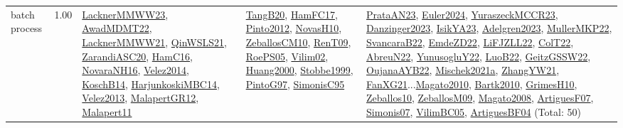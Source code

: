 {\begin{longtable}{p{3cm}r>{\raggedright\arraybackslash}p{6cm}>{\raggedright\arraybackslash}p{6cm}>{\raggedright\arraybackslash}p{8cm}}
\index{batch process}\index{Concepts!batch process}batch process &  1.00 & \hyperref[detail:LacknerMMWW23]{LacknerMMWW23}, \hyperref[detail:AwadMDMT22]{AwadMDMT22}, \hyperref[detail:LacknerMMWW21]{LacknerMMWW21}, \hyperref[detail:QinWSLS21]{QinWSLS21}, \hyperref[detail:ZarandiASC20]{ZarandiASC20}, \hyperref[detail:HamC16]{HamC16}, \hyperref[detail:NovaraNH16]{NovaraNH16}, \hyperref[detail:Velez2014]{Velez2014}, \hyperref[detail:KoschB14]{KoschB14}, \hyperref[detail:HarjunkoskiMBC14]{HarjunkoskiMBC14}, \hyperref[detail:Velez2013]{Velez2013}, \hyperref[detail:MalapertGR12]{MalapertGR12}, \hyperref[detail:Malapert11]{Malapert11} & \hyperref[detail:TangB20]{TangB20}, \hyperref[detail:HamFC17]{HamFC17}, \hyperref[detail:Pinto2012]{Pinto2012}, \hyperref[detail:NovasH10]{NovasH10}, \hyperref[detail:ZeballosCM10]{ZeballosCM10}, \hyperref[detail:RenT09]{RenT09}, \hyperref[detail:RoePS05]{RoePS05}, \hyperref[detail:Vilim02]{Vilim02}, \hyperref[detail:Huang2000]{Huang2000}, \hyperref[detail:Stobbe1999]{Stobbe1999}, \hyperref[detail:PintoG97]{PintoG97}, \hyperref[detail:SimonisC95]{SimonisC95} & \hyperref[detail:PrataAN23]{PrataAN23}, \hyperref[detail:Euler2024]{Euler2024}, \hyperref[detail:YuraszeckMCCR23]{YuraszeckMCCR23}, \hyperref[detail:Danzinger2023]{Danzinger2023}, \hyperref[detail:IsikYA23]{IsikYA23}, \hyperref[detail:Adelgren2023]{Adelgren2023}, \hyperref[detail:MullerMKP22]{MullerMKP22}, \hyperref[detail:SvancaraB22]{SvancaraB22}, \hyperref[detail:EmdeZD22]{EmdeZD22}, \hyperref[detail:LiFJZLL22]{LiFJZLL22}, \hyperref[detail:ColT22]{ColT22}, \hyperref[detail:AbreuN22]{AbreuN22}, \hyperref[detail:YunusogluY22]{YunusogluY22}, \hyperref[detail:LuoB22]{LuoB22}, \hyperref[detail:GeitzGSSW22]{GeitzGSSW22}, \hyperref[detail:OujanaAYB22]{OujanaAYB22}, \hyperref[detail:Mischek2021a]{Mischek2021a}, \hyperref[detail:ZhangYW21]{ZhangYW21}, \hyperref[detail:FanXG21]{FanXG21}...\hyperref[detail:Magato2010]{Magato2010}, \hyperref[detail:Bartk2010]{Bartk2010}, \hyperref[detail:GrimesH10]{GrimesH10}, \hyperref[detail:Zeballos10]{Zeballos10}, \hyperref[detail:ZeballosM09]{ZeballosM09}, \hyperref[detail:Magato2008]{Magato2008}, \hyperref[detail:ArtiguesF07]{ArtiguesF07}, \hyperref[detail:Simonis07]{Simonis07}, \hyperref[detail:VilimBC05]{VilimBC05}, \hyperref[detail:ArtiguesBF04]{ArtiguesBF04} (Total: 50)\\

\end{longtable}}
